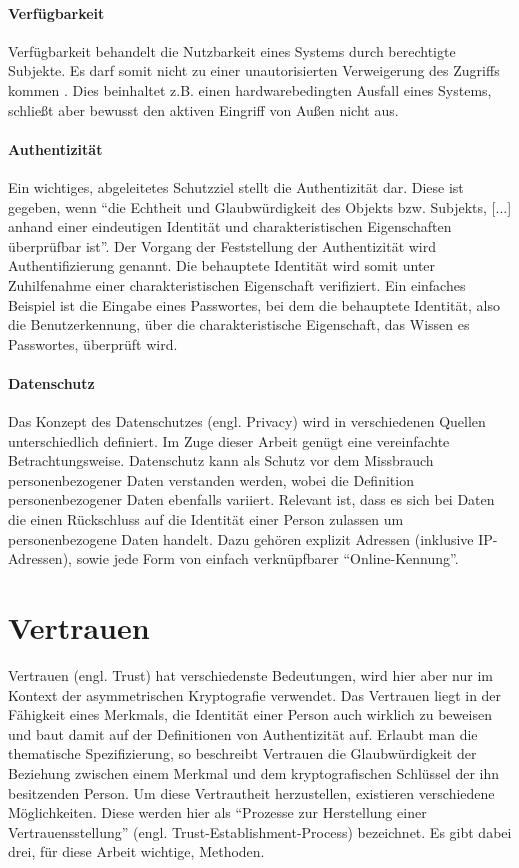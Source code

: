 \paragraph{Verfügbarkeit}
Verfügbarkeit behandelt die Nutzbarkeit eines Systems durch berechtigte Subjekte. Es darf somit nicht zu einer unautorisierten Verweigerung des Zugriffs kommen \cite[p. 12]{Eckert2013}. Dies beinhaltet z.B. einen hardwarebedingten Ausfall eines Systems, schließt aber bewusst den aktiven Eingriff von Außen nicht aus.
 
\paragraph{Authentizität}
Ein wichtiges, abgeleitetes Schutzziel stellt die Authentizität dar. Diese ist gegeben, wenn \enquote{die Echtheit und Glaubwürdigkeit des Objekts bzw. Subjekts, [...] anhand einer eindeutigen Identität und charakteristischen Eigenschaften überprüfbar ist}\cite[p. 8]{Eckert2013}. Der Vorgang der Feststellung der Authentizität wird Authentifizierung genannt. Die behauptete Identität wird somit unter Zuhilfenahme einer charakteristischen Eigenschaft verifiziert. Ein einfaches Beispiel ist die Eingabe eines Passwortes, bei dem die behauptete Identität, also die Benutzerkennung, über die charakteristische Eigenschaft, das Wissen es Passwortes, überprüft wird.  

\paragraph{Datenschutz}
Das Konzept des Datenschutzes (engl. Privacy) wird in verschiedenen Quellen unterschiedlich definiert. Im Zuge dieser Arbeit genügt eine vereinfachte Betrachtungsweise. Datenschutz kann als Schutz vor dem Missbrauch personenbezogener Daten verstanden werden, wobei die Definition personenbezogener Daten ebenfalls variiert. Relevant ist, dass es sich bei Daten die einen Rückschluss auf die Identität einer Person zulassen um personenbezogene Daten handelt. Dazu gehören explizit Adressen (inklusive IP-Adressen), sowie jede Form von einfach verknüpfbarer ``Online-Kennung''\cite{Schwenke2018}.     

\section{Vertrauen}
\label{sec:trust}
Vertrauen (engl. Trust) hat verschiedenste Bedeutungen, wird hier aber nur im Kontext der asymmetrischen Kryptografie verwendet. Das Vertrauen liegt in der Fähigkeit eines Merkmals, die Identität einer Person auch wirklich zu beweisen und baut damit auf der Definitionen von Authentizität auf\cite{Perrin2010}. Erlaubt man die thematische Spezifizierung, so beschreibt Vertrauen die Glaubwürdigkeit der Beziehung zwischen einem Merkmal und dem kryptografischen Schlüssel der ihn besitzenden Person. Um diese Vertrautheit herzustellen, existieren verschiedene Möglichkeiten. Diese werden hier als ``Prozesse zur Herstellung einer Vertrauensstellung'' (engl. Trust-Establishment-Process) bezeichnet. Es gibt dabei drei, für diese Arbeit wichtige, Methoden.

